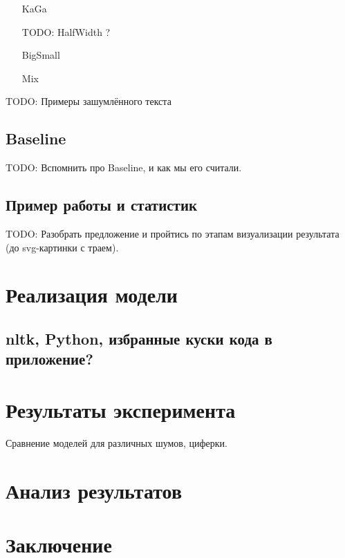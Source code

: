 \documentclass[14pt,russian]{extreport}
\theoremstyle{definition}
\newcommand{\todo}[1]{}
\renewcommand{\todo}[1]{{\color{red} TODO: {#1}}}
\begin{document}
\begin{itemize}
	\item[KaGa]

	\todo{ HalfWidth ?}

	\item[BigSmall]

	\item[Mix]
\end{itemize}

\todo{Примеры зашумлённого текста}

\subsection{ Baseline }

\todo{Вспомнить про Baseline, и как мы его считали.}

\subsection{ Пример работы и статистик }

\todo{ Разобрать предложение и пройтись по этапам визуализации результата (до svg-картинки с траем). }

\newpage
\section{ Реализация модели }\label{sec:coding}

\subsection{ nltk, Python, избранные куски кода в приложение? }

\newpage
\section{ Результаты эксперимента }\label{sec:results}

Сравнение моделей для различных шумов, циферки.

\newpage
\section{ Анализ результатов }\label{sec:analysis}

\newpage
\section{ Заключение }\label{sec:epilogue}
\end{document}
